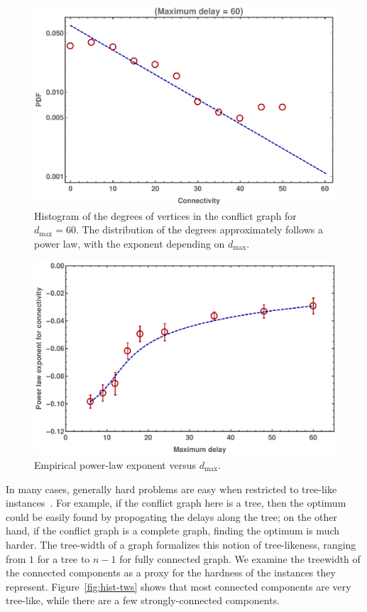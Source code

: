\begin{figure}[p]
\includegraphics[width=0.95\columnwidth]{pics/instances/connectivity_pdf.pdf}
\caption[Histogram of degrees]{Histogram of the degrees of vertices in the conflict graph for $d_{\max} = 60$. 
The distribution of the degrees approximately follows a power law, with the exponent depending on $d_{\max}$.
}
\label{fig:hist-degree}
\end{figure}

\begin{figure}
\includegraphics[width=0.95\columnwidth]{pics/instances/connectivity_pl.pdf}
\caption[Power-law exponent vs. $d_{\max}$]{Empirical power-law exponent versus $d_{\max}$.}
\label{fig:exponent-vs-dmax}
\end{figure}

In many cases, generally hard problems are easy when restricted to tree-like instances~\cite{bertele1972, halin1976s}.
For example, if the conflict graph here is a tree, then the optimum could be easily found by propogating the delays along the tree;
on the other hand, if the conflict graph is a complete graph, finding the optimum is much harder.
The tree-width of a graph formalizes this notion of tree-likeness, ranging from $1$ for a tree to $n-1$ for fully connected graph.
We examine the treewidth of the connected components as a proxy for the hardness of the instances they represent.
Figure~\ref{fig:hist-tws} shows that most connected components are very tree-like, while there are a few strongly-connected components.

